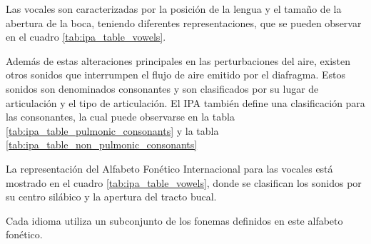Las vocales son caracterizadas por la posición de la lengua y el tamaño de la abertura de la boca, teniendo diferentes representaciones, que se pueden observar en el cuadro \ref{tab:ipa_table_vowels}. 



Además de estas alteraciones principales en las perturbaciones del aire, existen otros sonidos que interrumpen el flujo de aire emitido por el diafragma. Estos sonidos son denominados consonantes y son clasificados por su lugar de articulación y el tipo de articulación. El IPA también define una clasificación para las consonantes, la cual puede observarse en la tabla \ref{tab:ipa_table_pulmonic_consonants} y la tabla \ref{tab:ipa_table_non_pulmonic_consonants}









La representación del Alfabeto Fonético Internacional para las vocales está mostrado en el cuadro \ref{tab:ipa_table_vowels}, donde se clasifican los sonidos por su centro silábico y la apertura del tracto bucal.


%
%
%

Cada idioma utiliza un subconjunto de los fonemas definidos en este alfabeto fonético.


